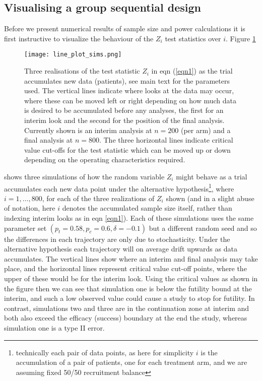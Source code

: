 \documentclass{article}
\begin{document}
\subsection{Visualising a group sequential design}
Before we present numerical results of sample size and power calculations it is first instructive to visualize the behaviour of the $Z_i$ test statistics over $i$. Figure \ref{fig1}
\begin{figure}[htbp]
	\centering
	\texttt{[image: line\_plot\_sims.png]}
	\caption{Three realisations of the test statistic $Z_i$ in eqn (\ref{eqn1}) as the trial accumulates new data (patients), see main text for the parameters used.  The vertical lines indicate where looks at the data may occur, where these can be moved left or right depending on how much data is desired to be accumulated before any analyses, the first for an interim look and the second for the position of the final analysis. Currently shown is an interim analysis at $n=200$ (per arm) and a final analysis at $n=800$. The three horizontal lines indicate critical value cut-offs for the test statistic which can be moved up or down depending on the operating characteristics required.} 
	\label{fig1}
\end{figure}
shows three simulations of how the random variable $Z_i$ might behave as a trial accumulates each new data point under the alternative hypothesis\footnote{technically each pair of data points, as here for simplicity $i$ is the accumulation of a pair of patients, one for each treatment arm, and we are assuming fixed 50/50 recruitment balance}, where $i=1,\dots,800$, for each of the three realizations of $Z_i$ shown (and in a slight abuse of notation, here $i$ denotes the accumulated sample size itself, rather than indexing interim looks as in eqn \ref{eqn1}). Each of these simulations uses the same parameter set $(p_t=0.58, p_c=0.6, \delta=-0.1)$ but a different random seed and so the differences in each trajectory are only due to stochasticity. Under the alternative hypothesis each trajectory will on average drift upwards as data accumulates. The vertical lines show where an interim and final analysis may take place, and the horizontal lines represent critical value cut-off points, where the upper of these would be for the interim look. Using the critical values as shown in the figure then we can see that simulation one is below the futility bound at the interim, and such a low observed value could cause a study to stop for futility. In contrast, simulations two and three are in the continuation zone at interim and both also exceed the efficacy (success) boundary at the end the study, whereas simulation one is a type II error.   
\end{document}
